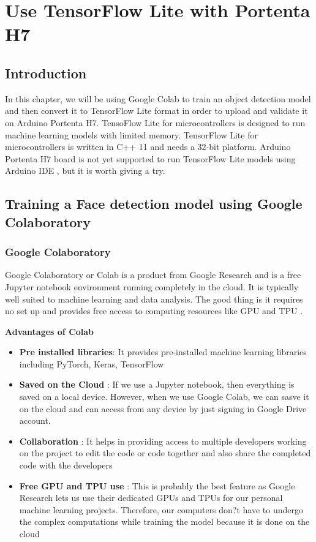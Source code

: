 	
	\chapter{Use TensorFlow Lite with Portenta H7}
	
	\section{Introduction}
	In this chapter, we will be using Google Colab to train an object detection model and then convert it to TensorFlow Lite format in order to upload and validate  it on Arduino Portenta H7. TensoFlow Lite for microcontrollers is designed to run machine learning models with limited memory. TensorFlow Lite for microcontrollers is written in C++ 11 and needs a 32-bit platform.  Arduino Portenta H7 board is not yet supported to run TensorFlow Lite models using Arduino IDE \cite{GoogleTensorFlowLite:2021}, but it is worth giving a try.
	\section{Training a Face detection model using Google Colaboratory}
	\subsection{Google Colaboratory}
	Google Colaboratory or Colab is a product from Google Research and  is a free Jupyter notebook environment running completely in the cloud. It is typically well suited to machine learning and data analysis. The good thing is it requires no set up and provides free access to computing resources like GPU and TPU \cite{GoogleColab:2021}.
	
	
	\textbf{Advantages of Colab} 
	\begin{itemize}  
		\item \textbf{Pre installed libraries}: It provides pre-installed machine learning libraries including PyTorch, Keras, TensorFlow
		\item \textbf{Saved on the Cloud} : If we use a Jupyter notebook, then everything is saved on a local device. However, when we use Google Colab, we can sasve it on the cloud and can access from any device by just signing in Google Drive account.
		\item \textbf{Collaboration} : It helps in providing access to multiple developers working on the project to edit the code or code together and also share the completed code with the developers
		\item \textbf{Free GPU and TPU use} : 
		This is probably the best feature as Google Research lets us use their dedicated GPUs and TPUs for our personal machine learning projects. Therefore, our computers don?t have to undergo the complex computations while training the model because it is done on the cloud
		
	\end{itemize}
	
